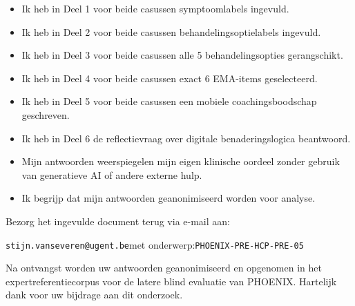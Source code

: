 \documentclass[11pt,a4paper]{article}
\begin{document}
\begin{instrbox}[title=Checklist voor terugbezorging]
\begin{itemize}
\item[$\square$] Ik heb in Deel 1 voor beide casussen symptoomlabels ingevuld.
\item[$\square$] Ik heb in Deel 2 voor beide casussen behandelingsoptielabels ingevuld.
\item[$\square$] Ik heb in Deel 3 voor beide casussen alle 5 behandelingsopties gerangschikt.
\item[$\square$] Ik heb in Deel 4 voor beide casussen exact 6 EMA-items geselecteerd.
\item[$\square$] Ik heb in Deel 5 voor beide casussen een mobiele coachingsboodschap geschreven.
\item[$\square$] Ik heb in Deel 6 de reflectievraag over digitale benaderingslogica beantwoord.
\item[$\square$] Mijn antwoorden weerspiegelen mijn eigen klinische oordeel zonder gebruik van generatieve AI of andere externe hulp.
\item[$\square$] Ik begrijp dat mijn antwoorden geanonimiseerd worden voor analyse.
\end{itemize}
\end{instrbox}

\medskip
Bezorg het ingevulde document terug via e-mail aan:
\begin{center}
\texttt{stijn.vanseveren@ugent.be}\quad met onderwerp:\quad \texttt{PHOENIX-PRE-HCP-PRE-05}
\end{center}

\vspace{0.5em}
\begin{tcolorbox}[colback=AccentBlue,colframe=PrimaryBlue,arc=2mm,boxrule=0.6pt,left=8pt,right=8pt,top=7pt,bottom=7pt]
\small\centering
Na ontvangst worden uw antwoorden geanonimiseerd en opgenomen in het expertreferentiecorpus
voor de latere blind evaluatie van PHOENIX. Hartelijk dank voor uw bijdrage aan dit onderzoek.
\end{tcolorbox}
\end{document}
